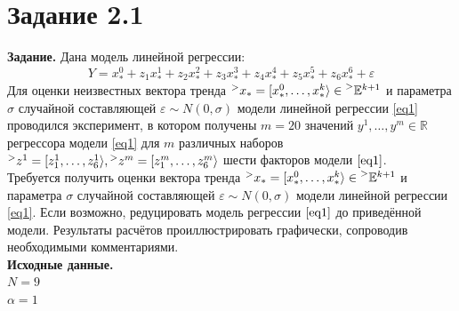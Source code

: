 \documentclass[14pt,a4paper]{scrartcl}
\begin{document}
\section*{Задание 2.1}
\textbf{Задание.} Дана модель линейной регрессии:
\begin{equation}\label{eq1} 
	Y=x_{*}^{0}+z_{1} x_{*}^{1}+z_{2} x_{*}^{2}+z_{3} x_{*}^{3}+z_{4} x_{*}^{4}+z_{5} x_{*}^{5}+z_{6} x_{*}^{6}+\varepsilon
\end{equation}
Для оценки неизвестных вектора тренда $\prescript{>}{}{x}_* = [x_*^0, \dots, x_*^k \rangle \in \prescript{>}{}{\mathbb{E}}^{k+1}$ и параметра $\sigma$ случайной составляющей $\varepsilon \sim N(0, \sigma)$ модели линейной регрессии \ref{eq1} проводился эксперимент, в котором получены $m=20$ значений $y^1, \dots, y^m \in \mathbb{R}$ регрессора модели \ref{eq1} для $m$ различных наборов $\prescript{>}{}{z}^1 = [z_1^1, \dots, z_6^1 \rangle, \prescript{>}{}{z}^m = [z_1^m, \dots, z_6^m \rangle$ шести факторов модели $\ref{eq1}$.\\
Требуется получить оценки вектора тренда $\prescript{>}{}{x}_* = [x_*^0, \dots, x_*^k \rangle \in \prescript{>}{}{\mathbb{E}}^{k+1}$ и параметра $\sigma$ случайной составляющей $\varepsilon \sim N(0, \sigma)$ модели линейной регрессии \ref{eq1}. Если возможно, редуцировать модель регрессии $\ref{eq1}$ до приведённой модели. Результаты расчётов проиллюстрировать графически, сопроводив необходимыми комментариями.\\
\textbf{Исходные данные.}\\
$N = 9$\\
$\alpha = 1$
\end{document}

